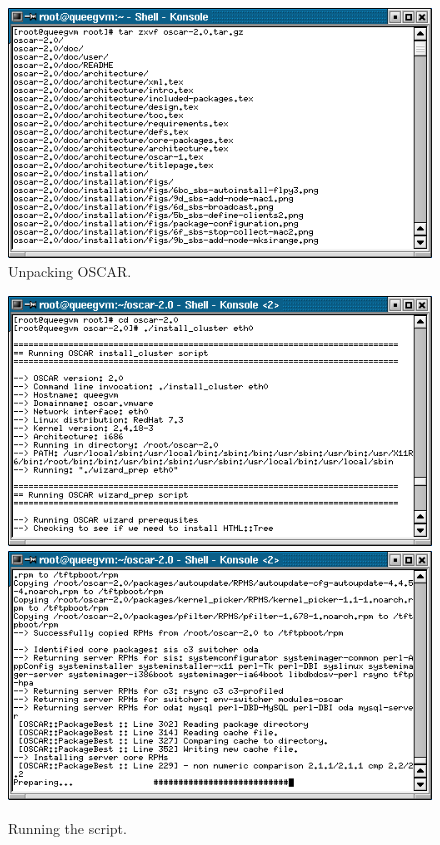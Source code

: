 \begin{figure}[h!]
  \begin{center}
    \centerline{\includegraphics[scale=\imgscale]{figs/0c_sbs-unpack}}
    \caption{Unpacking OSCAR.}
    \label{fig:sbs-unpacking-oscar}
  \end{center}
\end{figure}

\begin{figure}[h!]
  \begin{center}
    \centerline{
      \includegraphics[scale=\imgscale]{figs/1a_sbs-install-oscar}
      \hspace{\imghskip}
      \includegraphics[scale=\imgscale]{figs/1b_sbs-install-oscar2}
      }
    \caption{Running the  script.}
    \label{fig:sbs-install-oscar}
  \end{center}
\end{figure}

